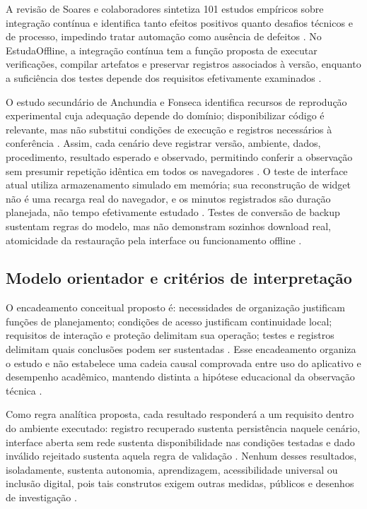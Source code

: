 A revisão de Soares e colaboradores sintetiza 101 estudos empíricos sobre integração contínua e identifica tanto efeitos positivos quanto desafios técnicos e de processo, impedindo tratar automação como ausência de defeitos \citep{eng15}.
No EstudaOffline, a integração contínua tem a função proposta de executar verificações, compilar artefatos e preservar registros associados à versão, enquanto a suficiência dos testes depende dos requisitos efetivamente examinados \citep{eng15}.

O estudo secundário de Anchundia e Fonseca identifica recursos de reprodução experimental cuja adequação depende do domínio; disponibilizar código é relevante, mas não substitui condições de execução e registros necessários à conferência \citep{eng11}.
Assim, cada cenário deve registrar versão, ambiente, dados, procedimento, resultado esperado e observado, permitindo conferir a observação sem presumir repetição idêntica em todos os navegadores \citep{eng11}.
O teste de interface atual utiliza armazenamento simulado em memória; sua reconstrução de widget não é uma recarga real do navegador, e os minutos registrados são duração planejada, não tempo efetivamente estudado .
Testes de conversão de backup sustentam regras do modelo, mas não demonstram sozinhos download real, atomicidade da restauração pela interface ou funcionamento offline \citep{eng06}.

\subsection{Modelo orientador e critérios de interpretação}
O encadeamento conceitual proposto é: necessidades de organização justificam funções de planejamento; condições de acesso justificam continuidade local; requisitos de interação e proteção delimitam sua operação; testes e registros delimitam quais conclusões podem ser sustentadas \citep{education_wolters2021,martin2024,eng06,OS18}.
Esse encadeamento organiza o estudo e não estabelece uma cadeia causal comprovada entre uso do aplicativo e desempenho acadêmico, mantendo distinta a hipótese educacional da observação técnica \citep{education_araka2020}.

Como regra analítica proposta, cada resultado responderá a um requisito dentro do ambiente executado: registro recuperado sustenta persistência naquele cenário, interface aberta sem rede sustenta disponibilidade nas condições testadas e dado inválido rejeitado sustenta aquela regra de validação \citep{eng06,eng11}.
Nenhum desses resultados, isoladamente, sustenta autonomia, aprendizagem, acessibilidade universal ou inclusão digital, pois tais construtos exigem outras medidas, públicos e desenhos de investigação \citep{education_araka2020,bong2021,martin2024}.

\label{sec:referencial-fim}
\clearpage
